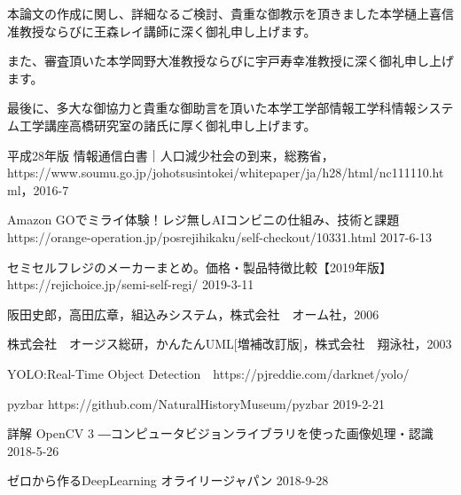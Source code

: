 本論文の作成に関し、詳細なるご検討、貴重な御教示を頂きました本学樋上喜信准教授ならびに王森レイ講師に深く御礼申し上げます。

また、審査頂いた本学岡野大准教授ならびに宇戸寿幸准教授に深く御礼申し上げます。

最後に、多大な御協力と貴重な御助言を頂いた本学工学部情報工学科情報システム工学講座高橋研究室の諸氏に厚く御礼申し上げます。


\begin{thebibliography}{99}

平成28年版 情報通信白書｜人口減少社会の到来，総務省，https://www.soumu.go.jp/johotsusintokei/whitepaper/ja/h28/html/nc111110.html，2016-7

Amazon GOでミライ体験！レジ無しAIコンビニの仕組み、技術と課題 https://orange-operation.jp/posrejihikaku/self-checkout/10331.html 2017-6-13

セミセルフレジのメーカーまとめ。価格・製品特徴比較【2019年版】 https://rejichoice.jp/semi-self-regi/
2019-3-11

阪田史郎，高田広章，組込みシステム，株式会社　オーム社，2006

株式会社　オージス総研，かんたんUML[増補改訂版]，株式会社　翔泳社，2003

YOLO:Real-Time Object Detection　https://pjreddie.com/darknet/yolo/

pyzbar https://github.com/NaturalHistoryMuseum/pyzbar 2019-2-21

詳解 OpenCV 3 ―コンピュータビジョンライブラリを使った画像処理・認識 2018-5-26

ゼロから作るDeepLearning オライリージャパン  2018-9-28


\end{thebibliography}

